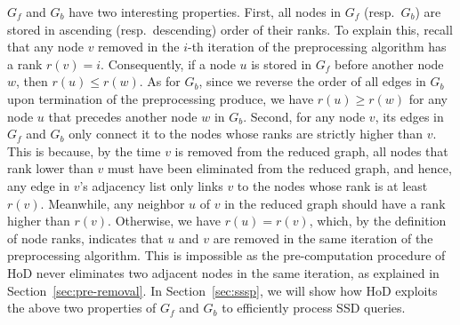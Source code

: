 \documentclass{sig-alternate}
\def\figcapup{\vspace{-2mm}}
\def\figcapdown{\vspace{-3mm}}
\def\GF{G_f}
\def\GB{G_b}
\begin{document}
\begin{sloppy}


$\GF$ and $\GB$ have two interesting properties. First, all nodes in $\GF$ (resp.\ $\GB$) are stored in ascending (resp.\ descending) order of their ranks. To explain this, recall that any node $v$ removed in the $i$-th iteration of the preprocessing algorithm has a rank $r(v)=i$. Consequently, if a node $u$ is stored in $\GF$ before another node $w$, then $r(u) \le r(w)$. As for $\GB$, since we reverse the order of all edges in $\GB$ upon termination of the preprocessing produce, we have $r(u) \ge r(w)$ for any node $u$ that precedes another node $w$ in $\GB$. Second, for any node $v$, its edges in $\GF$ and $\GB$ only connect it to the nodes whose ranks are strictly higher than $v$. This is because, by the time $v$ is removed from the reduced graph, all nodes that rank lower than $v$ must have been eliminated from the reduced graph, and hence, any edge in $v$'s adjacency list only links $v$ to the nodes whose rank is at least $r(v)$. Meanwhile, any neighbor $u$ of $v$ in the reduced graph should have a rank higher than $r(v)$. Otherwise, we have $r(u) = r(v)$, which, by the definition of node ranks, indicates that $u$ and $v$ are removed in the same iteration of the preprocessing algorithm. This is impossible as the pre-computation procedure of HoD never eliminates two adjacent nodes in the same iteration, as explained in Section~\ref{sec:pre-removal}. In Section~\ref{sec:sssp}, we will show how HoD exploits the above two properties of $\GF$ and $\GB$ to efficiently process SSD queries.


\end{sloppy}
\end{document}
